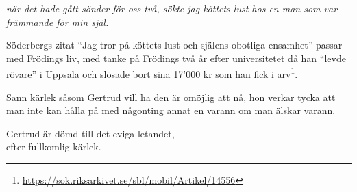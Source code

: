 \documentclass[12pt, letterpaper, twoside]{article}
\begin{document}
\begin{flushleft}
\textit{när det hade gått sönder för oss två, sökte jag köttets lust hos en man som var främmande för min själ.}


\hfill

Söderbergs zitat ``Jag tror på köttets lust och själens obotliga ensamhet'' passar med Frödings liv,
med tanke på Frödings två år efter universitetet då han ``levde rövare'' i Uppsala och slösade bort
sina 17'000 kr som han fick i arv\footnote{\url{https://sok.riksarkivet.se/sbl/mobil/Artikel/14556}}.

Sann kärlek såsom Gertrud vill ha den är omöjlig att nå, hon verkar tycka att man inte kan hålla
på med någonting annat en varann om man älskar varann.

Gertrud är dömd till det eviga letandet,\\
efter fullkomlig kärlek.

\end{flushleft}
\end{document}
